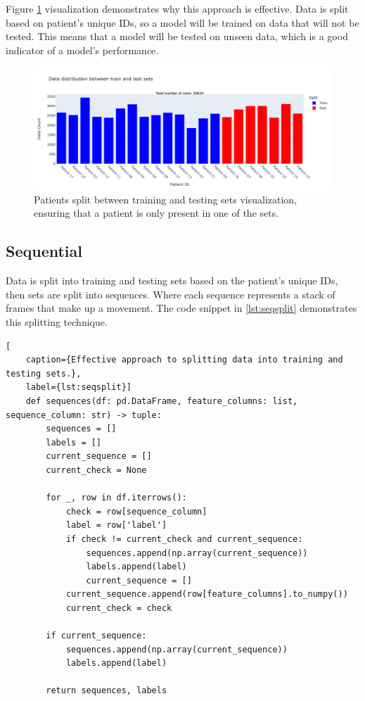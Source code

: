             Figure \ref{fig:goodsplit} visualization demonstrates why this approach is effective. Data is split based on patient's unique IDs, so a model will be trained on data that will not be tested. This means that a model will be tested on unseen data, which is a good indicator of a model's performance.

            \begin{figure}[H]
                \centering
                \includegraphics[width=1.0\textwidth]{../src/resources/plots/splits/good.png}
                \caption{
                    Patients split between training and testing sets visualization, ensuring that a patient is only present in one of the sets.
                }
                \label{fig:goodsplit}
            \end{figure}

    \newpage
            
            \subsection{Sequential} \label{sec:seqsplit}
            Data is split into training and testing sets based on the patient's unique IDs, then sets are split into sequences. Where each sequence represents a stack of frames that make up a movement. The code snippet in \ref{lst:seqsplit} demonstrates this splitting technique. 

\begin{lstlisting}[
    caption={Effective approach to splitting data into training and testing sets.}, 
    label={lst:seqsplit}]                
    def sequences(df: pd.DataFrame, feature_columns: list, sequence_column: str) -> tuple:
        sequences = []
        labels = []
        current_sequence = []
        current_check = None

        for _, row in df.iterrows():
            check = row[sequence_column]
            label = row['label']
            if check != current_check and current_sequence:
                sequences.append(np.array(current_sequence))
                labels.append(label)
                current_sequence = []
            current_sequence.append(row[feature_columns].to_numpy())
            current_check = check

        if current_sequence: 
            sequences.append(np.array(current_sequence))
            labels.append(label)

        return sequences, labels
\end{lstlisting}

